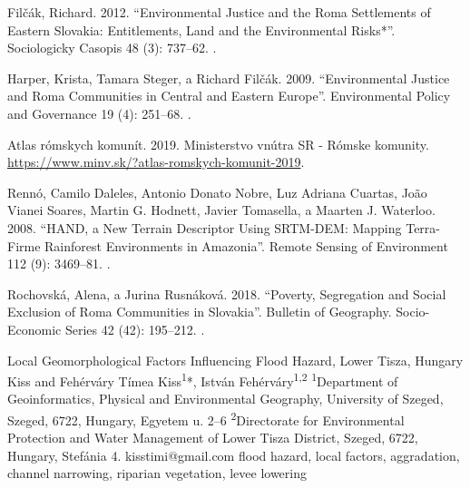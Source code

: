 {Filčák, Richard. 2012. “Environmental Justice and the Roma Settlements of Eastern Slovakia: Entitlements, Land and the Environmental Risks*”. Sociologicky Casopis 48 (3): 737–62. .
	
	Harper, Krista, Tamara Steger, a Richard Filčák. 2009. “Environmental Justice and Roma Communities in Central and Eastern Europe”. Environmental Policy and Governance 19 (4): 251–68. .
	
	Atlas rómskych komunít. 2019. Ministerstvo vnútra SR - Rómske komunity. \url{https://www.minv.sk/?atlas-romskych-komunit-2019}.
	
	Rennó, Camilo Daleles, Antonio Donato Nobre, Luz Adriana Cuartas, João Vianei Soares, Martin G. Hodnett, Javier Tomasella, a Maarten J. Waterloo. 2008. “HAND, a New Terrain Descriptor Using SRTM-DEM: Mapping Terra-Firme Rainforest Environments in Amazonia”. Remote Sensing of Environment 112 (9): 3469–81. .
	
	Rochovská, Alena, a Jurina Rusnáková. 2018. “Poverty, Segregation and Social Exclusion of Roma Communities in Slovakia”. Bulletin of Geography. Socio-Economic Series 42 (42): 195–212. .
}%
\abstract
{Local Geomorphological Factors Influencing Flood Hazard, Lower Tisza, Hungary} 
{Kiss and Fehérváry} 
{Tímea Kiss\textsuperscript{1}*, István Fehérváry\textsuperscript{1,2}} 
{\KLtag} 
{
	\textsuperscript{1}Department of Geoinformatics, Physical and Environmental Geography, University of Szeged, Szeged, 6722, Hungary, Egyetem u. 2–6
	\textsuperscript{2}Directorate for Environmental Protection and Water Management of Lower Tisza District,
	Szeged, 6722, Hungary, Stefánia 4.
}
{kisstimi@gmail.com}  %
{flood hazard, local factors, aggradation, channel narrowing, riparian vegetation, levee lowering}
